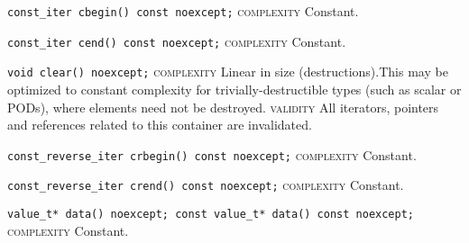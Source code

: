 \noindent{}\hspace*{0.25em}\lstinline[basicstyle=\ttfamily\color{cgreen}]{const_iter cbegin() const noexcept;} \textsc{complexity} Constant.\\\vspace{-0.6em}

\noindent{}\hspace*{0.25em}\lstinline[basicstyle=\ttfamily\color{cgreen}]{const_iter cend() const noexcept;} \textsc{complexity} Constant.\\\vspace{-0.6em}

\noindent{}\hspace*{0.25em}\lstinline[basicstyle=\ttfamily\color{corange}]{void clear() noexcept;} \textsc{complexity} Linear in size (destructions).This may be optimized to constant complexity for trivially-destructible types (such as scalar or PODs), where elements need not be destroyed. \textsc{validity} All iterators, pointers and references related to this container are invalidated.\\\vspace{-0.6em}

\noindent{}\hspace*{0.25em}\lstinline[basicstyle=\ttfamily\color{cgreen}]{const_reverse_iter crbegin() const noexcept;} \textsc{complexity} Constant.\\\vspace{-0.6em}

\noindent{}\hspace*{0.25em}\lstinline[basicstyle=\ttfamily\color{cgreen}]{const_reverse_iter crend() const noexcept;} \textsc{complexity} Constant.\\\vspace{-0.6em}

\noindent{}\hspace*{0.25em}\lstinline[basicstyle=\ttfamily\color{cgreen}]{value_t* data() noexcept; const value_t* data() const noexcept;} \textsc{complexity} Constant.\\\vspace{-0.6em}

